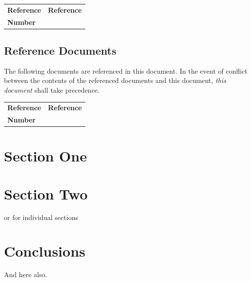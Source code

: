 \documentclass{article}
\begin{document}
\begin{center}{
\begin{tabularx}{\textwidth}{|X|X|}
    \hline
    \bf{Reference} & \bf{Reference}\\
    \bf{Number} & \\
    \hline
\end{tabularx}}
\end{center}

\subsection*{Reference Documents}

The following documents are referenced in this document. In the event of
conflict between the contents of the referenced documents and this document,
\emph{this document} shall take precedence.

\begin{center}{
\begin{tabularx}{\textwidth}{|X|X|}
    \hline
    \bf{Reference} & \bf{Reference}\\
    \bf{Number} & \\
    \hline
\end{tabularx}}
\end{center}



\newpage
\section{Section One}

\section{Section Two}

 or %
 for individual sections


\section{Conclusions}
\label{section:conclusions}

And here also.



%
\end{document}
